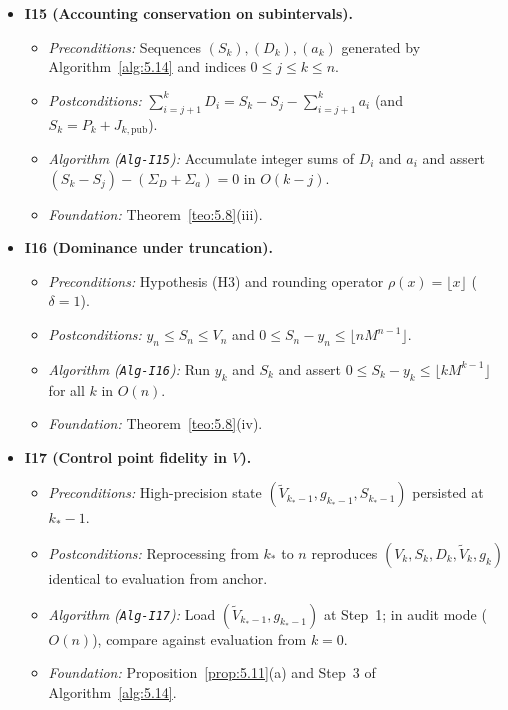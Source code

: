 \documentclass[11pt, a4paper]{article}
\theoremstyle{definition}
\theoremstyle{plain}
\theoremstyle{remark}
\begin{document}
\begin{itemize}
    \item \textbf{I15 (Accounting conservation on subintervals).}
    \begin{itemize}
        \item \emph{Preconditions:} Sequences $(S_k), (D_k), (a_k)$ generated by Algorithm~\ref{alg:5.14} and indices $0 \le j \le k \le n$.
        \item \emph{Postconditions:} $\sum_{i=j+1}^k D_i = S_k - S_j - \sum_{i=j+1}^k a_i$ (and $S_k = P_k + J_{k,\text{pub}}$).
        \item \emph{Algorithm (\texttt{Alg-I15}):} Accumulate integer sums of $D_i$ and $a_i$ and assert $(S_k - S_j) - (\Sigma_D + \Sigma_a) = 0$ in $O(k - j)$.
        \item \emph{Foundation:} Theorem~\ref{teo:5.8}(iii).
    \end{itemize}

    \item \textbf{I16 (Dominance under truncation).}
    \begin{itemize}
        \item \emph{Preconditions:} Hypothesis (H3) and rounding operator $\rho(x) = \lfloor x \rfloor$ ($\delta = 1$).
        \item \emph{Postconditions:} $y_n \le S_n \le V_n$ and $0 \le S_n - y_n \le \lfloor n M^{n-1} \rfloor$.
        \item \emph{Algorithm (\texttt{Alg-I16}):} Run $y_k$ and $S_k$ and assert $0 \le S_k - y_k \le \lfloor k M^{k-1} \rfloor$ for all $k$ in $O(n)$.
        \item \emph{Foundation:} Theorem~\ref{teo:5.8}(iv).
    \end{itemize}

    \item \textbf{I17 (Control point fidelity in $V$).}
    \begin{itemize}
        \item \emph{Preconditions:} High-precision state $(\tilde{V}_{k_* - 1}, g_{k_* - 1}, S_{k_* - 1})$ persisted at $k_* - 1$.
        \item \emph{Postconditions:} Reprocessing from $k_*$ to $n$ reproduces $(V_k, S_k, D_k, \tilde{V}_k, g_k)$ identical to evaluation from anchor.
        \item \emph{Algorithm (\texttt{Alg-I17}):} Load $(\tilde{V}_{k_* - 1}, g_{k_* - 1})$ at Step~1; in audit mode ($O(n)$), compare against evaluation from $k=0$.
        \item \emph{Foundation:} Proposition~\ref{prop:5.11}(a) and Step~3 of Algorithm~\ref{alg:5.14}.
    \end{itemize}


\end{itemize}
\end{document}
